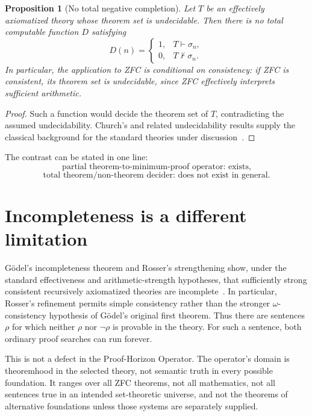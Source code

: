 \documentclass[11pt,oneside]{book}
\newtheorem{proposition}[theorem]{Proposition}
\theoremstyle{definition}
\theoremstyle{remark}
\begin{document}
\begin{proposition}[No total negative completion]\label{prop:no-total}
Let $T$ be an effectively axiomatized theory whose theorem set is undecidable. Then there is no total computable function $D$ satisfying
\[
D(n)=\begin{cases}
1,&T\vdash\sigma_n,\\
0,&T\nvdash\sigma_n.
\end{cases}
\]
In particular, the application to ZFC is conditional on consistency: if ZFC is consistent, its theorem set is undecidable, since ZFC effectively interprets sufficient arithmetic.
\end{proposition}
\begin{proof}
Such a function would decide the theorem set of $T$, contradicting the assumed undecidability. Church's and related undecidability results supply the classical background for the standard theories under discussion~\cite{church1936,turing1936,rosser1936}.
\end{proof}

The contrast can be stated in one line:
\[
\text{partial theorem-to-minimum-proof operator: exists,}
\]
\[
\text{total theorem/non-theorem decider: does not exist in general.}
\]

\section{Incompleteness is a different limitation}
G\"odel's incompleteness theorem and Rosser's strengthening show, under the standard effectiveness and arithmetic-strength hypotheses, that sufficiently strong consistent recursively axiomatized theories are incomplete~\cite{godel1931,rosser1936}. In particular, Rosser's refinement permits simple consistency rather than the stronger $\omega$-consistency hypothesis of G\"odel's original first theorem. Thus there are sentences $\rho$ for which neither $\rho$ nor $\neg\rho$ is provable in the theory. For such a sentence, both ordinary proof searches can run forever.

This is not a defect in the Proof-Horizon Operator. The operator's domain is theoremhood in the selected theory, not semantic truth in every possible foundation. It ranges over all ZFC theorems, not all mathematics, not all sentences true in an intended set-theoretic universe, and not the theorems of alternative foundations unless those systems are separately supplied.
\end{document}
